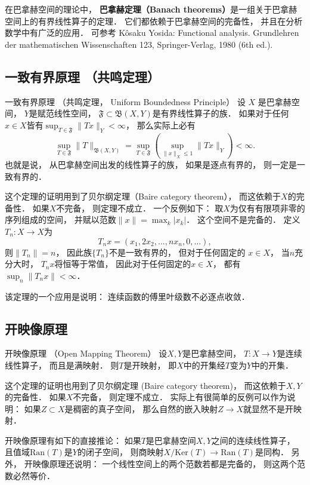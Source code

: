 
在巴拿赫空间的理论中， \textbf{巴拿赫定理（Banach theorems）}是一组关于巴拿赫空间上的有界线性算子的定理． 它们都依赖于巴拿赫空间的完备性， 并且在分析数学中有广泛的应用． 可参考 Kôsaku Yosida: Functional analysis. Grundlehren der mathematischen Wissenschaften 123, Springer-Verlag, 1980 (6th ed.).

\subsection{一致有界原理 （共鸣定理）}
\begin{theorem}{一致有界原理 （共鸣定理， Uniform Boundedness Principle）}
设 $X$ 是巴拿赫空间， $Y$是赋范线性空间， $\mathfrak{F}\subset\mathfrak{B}(X,Y)$是有界线性算子的族． 如果对于任何$x\in X$皆有$\sup_{T\in\mathfrak{F}}\|Tx\|_Y<\infty$， 那么实际上必有
$$
\sup_{T\in\mathfrak{F}}\|T\|_{\mathfrak{B}(X,Y)}
=\sup_{T\in\mathfrak{F}}\left(\sup_{\|x\|_X\leq 1}\|Tx\|_Y\right)<\infty.
$$
也就是说， 从巴拿赫空间出发的线性算子的族， 如果是逐点有界的， 则一定是一致有界的． 
\end{theorem}
这个定理的证明用到了贝尔纲定理（Baire category theorem）， 而这依赖于$X$的完备性． 如果$X$不完备， 则定理不成立． 一个反例如下： 取$X$为仅有有限项非零的序列组成的空间， 并赋以范数$\|x\|=\max_{k}|x_k|$． 这个空间不是完备的． 定义$T_n:X\to X$为
$$
T_nx=(x_1,2x_2,...,nx_n,0,...),
$$
则$\|T_n\|=n$， 因此族$\{T_n\}$不是一致有界的， 但对于任何固定的 $x\in X$， 当$n$充分大时， $T_nx$将恒等于常值， 因此对于任何固定的$x\in X$， 都有$\sup_n\|T_nx\|<\infty$．

该定理的一个应用是说明： 连续函数的傅里叶级数不必逐点收敛． 

\subsection{开映像原理}
\begin{theorem}{开映像原理 （Open Mapping Theorem）}
设$X,Y$是巴拿赫空间， $T:X\to Y$是连续线性算子， 而且是满映射． 则$T$是开映射， 即$X$中的开集经$T$变为$Y$中的开集．
\end{theorem}

这个定理的证明也用到了贝尔纲定理 (Baire category theorem)， 而这依赖于$X,Y$的完备性． 如果$X$不完备， 则定理不成立． 实际上有很简单的反例可以作为说明： 如果$Z\subset X$是稠密的真子空间， 那么自然的嵌入映射$Z\to X$就显然不是开映射．

开映像原理有如下的直接推论： 如果$T$是巴拿赫空间$X,Y$之间的连续线性算子， 且值域$\text{Ran}(T)$是$Y$的闭子空间， 则商映射$X/\text{Ker}(T)\to \text{Ran}(T)$是同构． 另外， 开映像原理还说明： 一个线性空间上的两个范数若都是完备的， 则这两个范数必然等价．

